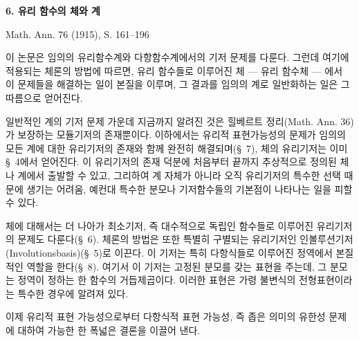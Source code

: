 
\begin{center}
{\Large\bfseries 6. 유리 함수의 체와 계}\par
\vspace{1.2em}
Math. Ann. 76 (1915), S. 161--196
\end{center}

\vspace{2em}

이 논문은 임의의 유리함수계와 다항함수계에서의 기저 문제를 다룬다. 그런데 여기에 적용되는 체론의 방법에 따르면, 유리 함수들로 이루어진 체 --- 유리 함수체 --- 에서 이 문제들을 해결하는 일이 본질을 이루며, 그 결과를 임의의 계로 일반화하는 일은 그 따름으로 얻어진다.

일반적인 계의 기저 문제 가운데 지금까지 알려진 것은 힐베르트 정리(Math. Ann. 36)가 보장하는 모듈기저의 존재뿐이다. 이하에서는 유리적 표현가능성의 문제가 임의의 모든 계에 대한 유리기저의 존재와 함께 완전히 해결되며(\S\ 7), 체의 유리기저는 이미 \S\ 4에서 얻어진다. 이 유리기저의 존재 덕분에 처음부터 끝까지 추상적으로 정의된 체나 계에서 출발할 수 있고, 그리하여 계 자체가 아니라 오직 유리기저의 특수한 선택 때문에 생기는 어려움, 예컨대 특수한 분모나 기저함수들의 기본점이 나타나는 일을 피할 수 있다.

체에 대해서는 더 나아가 최소기저, 즉 대수적으로 독립인 함수들로 이루어진 유리기저의 문제도 다룬다(\S\ 6). 체론의 방법은 또한 특별히 구별되는 유리기저인 인볼루션기저(Involutionsbasis)(\S\ 5)로 이끈다. 이 기저는 특히 다항식들로 이루어진 정역에서 본질적인 역할을 한다(\S\ 8). 여기서 이 기저는 고정된 분모를 갖는 표현을 주는데, 그 분모는 정역이 정하는 한 함수의 거듭제곱이다. 이러한 표현은 가령 불변식의 전형표현이라는 특수한 경우에 알려져 있다.

이제 유리적 표현 가능성으로부터 다항식적 표현 가능성, 즉 좁은 의미의 유한성 문제에 대하여 가능한 한 폭넓은 결론을 이끌어 낸다.


